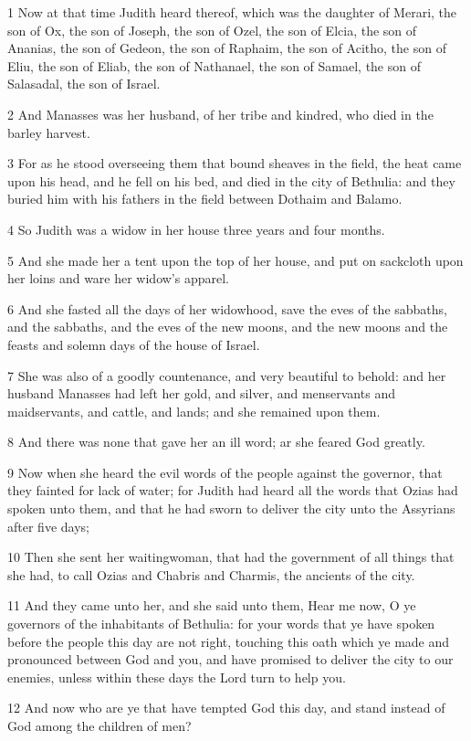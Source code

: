 \par 1 Now at that time Judith heard thereof, which was the daughter of Merari, the son of Ox, the son of Joseph, the son of Ozel, the son of Elcia, the son of Ananias, the son of Gedeon, the son of Raphaim, the son of Acitho, the son of Eliu, the son of Eliab, the son of Nathanael, the son of Samael, the son of Salasadal, the son of Israel.
\par 2 And Manasses was her husband, of her tribe and kindred, who died in the barley harvest.
\par 3 For as he stood overseeing them that bound sheaves in the field, the heat came upon his head, and he fell on his bed, and died in the city of Bethulia: and they buried him with his fathers in the field between Dothaim and Balamo.
\par 4 So Judith was a widow in her house three years and four months.
\par 5 And she made her a tent upon the top of her house, and put on sackcloth upon her loins and ware her widow's apparel.
\par 6 And she fasted all the days of her widowhood, save the eves of the sabbaths, and the sabbaths, and the eves of the new moons, and the new moons and the feasts and solemn days of the house of Israel.
\par 7 She was also of a goodly countenance, and very beautiful to behold: and her husband Manasses had left her gold, and silver, and menservants and maidservants, and cattle, and lands; and she remained upon them.
\par 8 And there was none that gave her an ill word; ar she feared God greatly.
\par 9 Now when she heard the evil words of the people against the governor, that they fainted for lack of water; for Judith had heard all the words that Ozias had spoken unto them, and that he had sworn to deliver the city unto the Assyrians after five days;
\par 10 Then she sent her waitingwoman, that had the government of all things that she had, to call Ozias and Chabris and Charmis, the ancients of the city.
\par 11 And they came unto her, and she said unto them, Hear me now, O ye governors of the inhabitants of Bethulia: for your words that ye have spoken before the people this day are not right, touching this oath which ye made and pronounced between God and you, and have promised to deliver the city to our enemies, unless within these days the Lord turn to help you.
\par 12 And now who are ye that have tempted God this day, and stand instead of God among the children of men?
